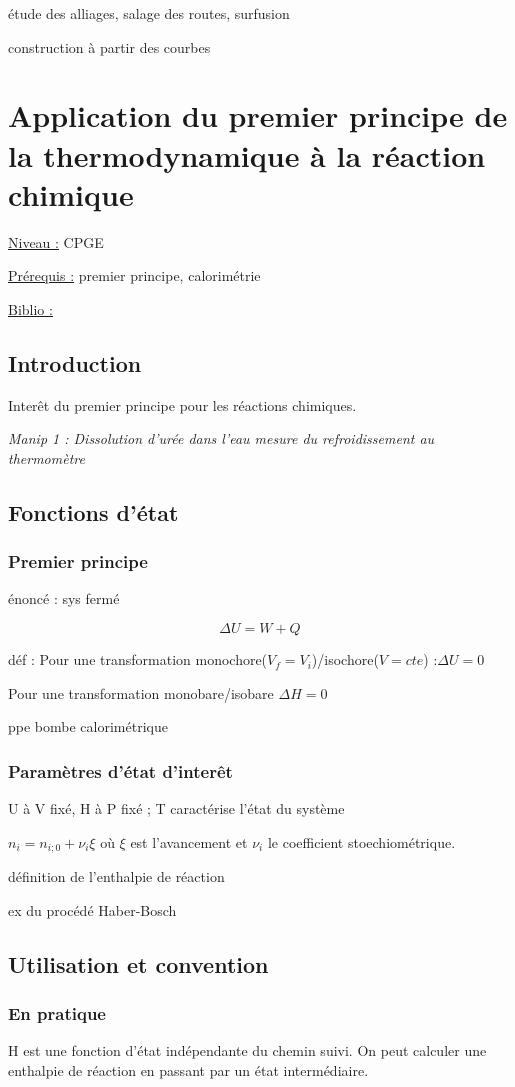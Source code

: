 \documentclass{article}%
\begin{document}
étude des alliages, salage des routes, surfusion

construction à partir des courbes
\section{Application du premier principe de la thermodynamique à la réaction chimique}
\underline{Niveau :} CPGE 

\underline{Prérequis :} premier principe, calorimétrie

\underline{Biblio :} 

\subsection{Introduction}

Interêt du premier principe pour les réactions chimiques.

\textit{Manip 1 : Dissolution d'urée dans l'eau mesure du refroidissement au thermomètre}
\subsection{Fonctions d'état}
\subsubsection{Premier principe}
énoncé : sys fermé

\[\Delta U = W +Q\]

déf : Pour une transformation monochore($V_f=V_i$)/isochore($V=cte$) :$\Delta U=0$

Pour une transformation monobare/isobare $\Delta H=0$

ppe bombe calorimétrique
\subsubsection{Paramètres d'état d'interêt}
U à V fixé, H à P fixé ; T caractérise l'état du système

$n_i=n_{i;0}+\nu_i\xi$ où $\xi$ est l'avancement et $\nu_i$ le coefficient stoechiométrique.

définition de l'enthalpie de réaction

ex du procédé Haber-Bosch
\subsection{Utilisation et convention}
\subsubsection{En pratique}
H est une fonction d'état indépendante du chemin suivi. On peut calculer une enthalpie de réaction en passant par un état intermédiaire.
\end{document}
